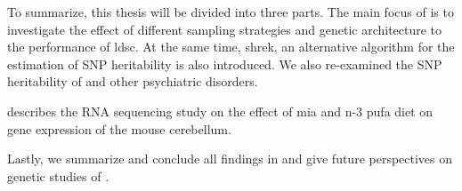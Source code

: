 	To summarize, this thesis will be divided into three parts. 
	The main focus of  is to investigate the effect of different sampling strategies and genetic architecture to the performance of \gls{ldsc}.
	At the same time, \gls{shrek}, an alternative algorithm for the estimation of \gls{SNP} heritability is also introduced. 
	We also re-examined the \gls{SNP} heritability of  and other psychiatric disorders.
	
	 describes the RNA sequencing study on the effect of \gls{mia} and n-3 \gls{pufa} diet on gene expression of the mouse cerebellum. 

	
	Lastly, we summarize and conclude all findings in  and give future perspectives on genetic studies of .
	